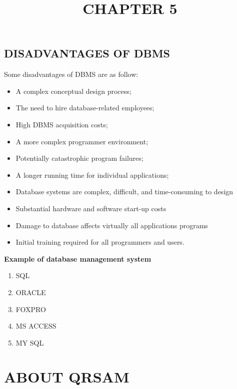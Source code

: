 \documentclass[14pt]{article} %
\begin{document}
 \subsection{DISADVANTAGES OF  DBMS}
Some disadvantages of DBMS are as follow:
\begin{itemize}
\item A complex conceptual design process;
\item	The need to hire database-related employees;
\item	High DBMS acquisition costs;
\item	A more complex programmer environment;
\item	Potentially catastrophic program failures;
\item	A longer running time for individual applications; 
\item	Database systems are complex, difficult, and time-consuming to design
\item	Substantial hardware and software start-up costs
\item	Damage to database affects virtually all applications programs
\item	Initial training required for all programmers and users.
\end{itemize}
\textbf{Example of database management system}
\begin{enumerate}
\item	SQL
\item	ORACLE
\item	FOXPRO
\item	MS ACCESS
\item	MY SQL
\end{enumerate}

\pagebreak

\title{CHAPTER 5}
\maketitle
\section{ABOUT QRSAM}
\end{document}
